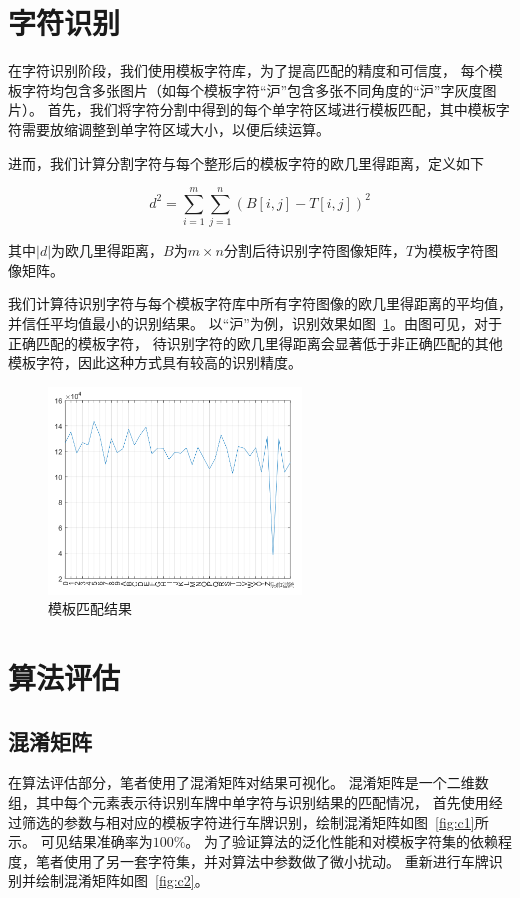 \documentclass[utf8,a4paper]{ctexart}
\begin{document}
\section{字符识别}
在字符识别阶段，我们使用模板字符库，为了提高匹配的精度和可信度，
每个模板字符均包含多张图片（如每个模板字符``沪''包含多张不同角度的``沪''字灰度图片）。
首先，我们将字符分割中得到的每个单字符区域进行模板匹配，其中模板字符需要放缩调整到单字符区域大小，以便后续运算。

进而，我们计算分割字符与每个整形后的模板字符的欧几里得距离，定义如下

\begin{equation}
    d^2=\sum_{i=1}^{m}\sum_{j=1}^n(B[i,j]-T[i,j])^2
\end{equation}

其中$|d|$为欧几里得距离，$B$为$m\times n$分割后待识别字符图像矩阵，$T$为模板字符图像矩阵。

我们计算待识别字符与每个模板字符库中所有字符图像的欧几里得距离的平均值，并信任平均值最小的识别结果。
以``沪''为例，识别效果如图~\ref{fig:template_match}。由图可见，对于正确匹配的模板字符，
待识别字符的欧几里得距离会显著低于非正确匹配的其他模板字符，因此这种方式具有较高的识别精度。

\begin{figure}[h]
    \centering
    \includegraphics[width=0.6\textwidth]{./img/easy/识别效果可视化.png}
    \caption{模板匹配结果}
    \label{fig:template_match}
\end{figure}

\section{算法评估}
\subsection{混淆矩阵}
在算法评估部分，笔者使用了混淆矩阵对结果可视化。
混淆矩阵是一个二维数组，其中每个元素表示待识别车牌中单字符与识别结果的匹配情况，
首先使用经过筛选的参数与相对应的模板字符进行车牌识别，绘制混淆矩阵如图~\ref{fig:c1}所示。
可见结果准确率为$100\%$。
为了验证算法的泛化性能和对模板字符集的依赖程度，笔者使用了另一套字符集，并对算法中参数做了微小扰动。
重新进行车牌识别并绘制混淆矩阵如图~\ref{fig:c2}。
\end{document}
